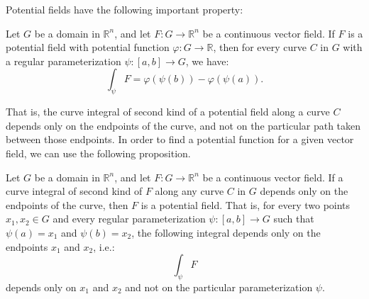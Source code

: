 Potential fields have the following important property:
\begin{prop}
    Let $G$ be a domain in $\mathbb{R}^n$, and let $F : G \to \mathbb{R}^n$ be a continuous vector field. If $F$ is a potential field with potential function $\varphi : G \to \mathbb{R}$, then for every curve $C$ in $G$ with a regular parameterization $\psi : [a, b] \to G$, we have:
    \[
        \int_\psi F = \varphi(\psi(b)) - \varphi(\psi(a)).
    \]
\end{prop}
That is, the curve integral of second kind of a potential field along a curve $C$ depends only on the endpoints of the curve, and not on the particular path taken between those endpoints. In order to find a potential function for a given vector field, we can use the following proposition.
\begin{prop}
    Let $G$ be a domain in $\mathbb{R}^n$, and let $F : G \to \mathbb{R}^n$ be a continuous vector field. If a curve integral of second kind of $F$ along any curve $C$ in $G$ depends only on the endpoints of the curve, then $F$ is a potential field. That is, for every two points $x_1, x_2 \in G$ and every regular parameterization $\psi : [a, b] \to G$ such that $\psi(a) = x_1$ and $\psi(b) = x_2$, the following integral depends only on the endpoints $x_1$ and $x_2$, i.e.:
\[
        \int_\psi F
\]
    depends only on $x_1$ and $x_2$ and not on the particular parameterization $\psi$.
\end{prop}

